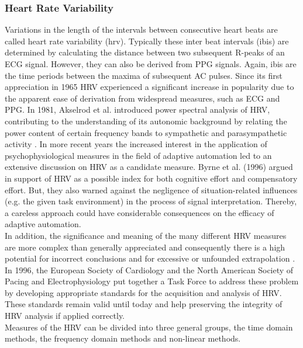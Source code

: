 \subsubsection{Heart Rate Variability}
Variations in the length of the intervals between consecutive heart beats are called heart rate variability (\gls{hrv}). Typically these inter beat intervals (\gls{ibi}s) are determined by calculating the distance between two subsequent R-peaks of an ECG signal. However, they can also be derived from PPG signals. Again, \gls{ibi}s are the time periods between the maxima of subsequent AC pulses. Since its first appreciation in 1965 HRV experienced a significant increase in popularity due to the apparent ease of derivation from widespread measures, such as ECG and PPG. In 1981, Akselrod et al. introduced power spectral analysis of HRV, contributing to the understanding of its autonomic background by relating the power content of certain frequency bands to sympathetic and parasympathetic activity \cite{TheEuropeanSocietyofCardiology1996}.
In more recent years the increased interest in the application of psychophysiological measures in the field of adaptive automation led to an extensive discussion on HRV as a candidate measure. Byrne et al. (1996) argued in support of HRV as a possible index for both cognitive effort and compensatory effort. But, they also warned against the negligence of situation-related influences (e.g. the given task environment) in the process of signal interpretation. Thereby, a careless approach could have considerable consequences on the efficacy of adaptive automation.\\
In addition, the significance and meaning of the many different HRV measures are more complex than generally appreciated and consequently there is a high potential for incorrect conclusions and for excessive or unfounded extrapolation \cite{TheEuropeanSocietyofCardiology1996}.
In 1996, the European Society of Cardiology and the North American Society of Pacing and Electrophysiology put together a Task Force to address these problem by developing appropriate standards for the acquisition and analysis of HRV.
These standards remain valid until today and help preserving the integrity of HRV analysis if applied correctly.\\
Measures of the HRV can be divided into three general groups, the time domain methods, the frequency domain methods and non-linear methods.

